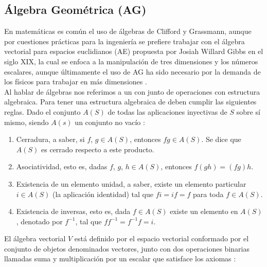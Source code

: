 \subsection{Álgebra Geométrica (AG)}

En matemáticas es común el uso de álgebras de Clifford y Grassmann, aunque por cuestiones prácticas para la ingeniería se prefiere trabajar con el álgebra vectorial para espacios euclidianos (AE) propuesta por Josiah Willard Gibbs en el siglo XIX, la cual se enfoca a la manipulación de tres dimensiones y los números escalares,  aunque últimamente el uso de AG ha sido necesario por la demanda de los físicos para trabajar en más dimensiones \cite{FoundOfAGC}.\\

Al hablar de álgebras nos referimos a un con junto de operaciones con estructura algebraica. Para tener una estructura algebraica de deben cumplir las siguientes reglas. Dado el conjunto $A(S)$ de todas las aplicaciones inyectivas de $S$ sobre sí mismo, siendo $A(s)$ un conjunto no vacío \cite{herstein1988algebra}:

\begin{enumerate}
	\item Cerradura, a saber, si $f$, $g \in A(S)$, entonces $fg \in A(S)$. Se dice que $A(S)$ es cerrado respecto a este producto.
	\item Asociatividad, esto es, dadas $f$, $g$, $h \in A(S)$, entonces $f(gh) = (fg)h$.
	\item Existencia de un elemento unidad, a saber, existe un elemento	particular $i \in A(S)$ (la aplicación identidad) tal que $fi = if = f$ para toda $f \in A (S)$.
	\item Existencia de inversas, esto es, dada $f \in A(S)$ existe un elemento en $A(S)$, denotado por $f^{-1}$, tal que $ff^{-1} = f^{-1}f = i$. 
\end{enumerate}


El álgebra vectorial $V$ está definido por el espacio vectorial conformado por el conjunto de objetos denominados vectores, junto con dos operaciones binarias llamadas suma y multiplicación por un escalar que satisface los axiomas \cite{grossman2008algebra}:

